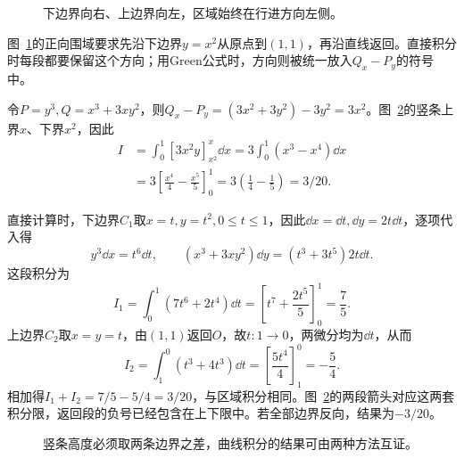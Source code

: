 \begin{figure}[H]\centering
{}
\caption{下边界向右、上边界向左，区域始终在行进方向左侧。}\label{fig:c4-e9-q}
\end{figure}
\begin{solution}
图~\ref{fig:c4-e9-q}的正向围域要求先沿下边界$y=x^2$从原点到$(1,1)$，再沿直线返回。直接积分时每段都要保留这个方向；用Green公式时，方向则被统一放入$Q_x-P_y$的符号中。


令$P=y^3,Q=x^3+3xy^2$，则$Q_x-P_y=(3x^2+3y^2)-3y^2=3x^2$。图~\ref{fig:c4-e9-s}的竖条上界$x$、下界$x^2$，因此
\[\begin{aligned}
I&=\int_0^1[3x^2y]_{x^2}^{x}\dd x
=3\int_0^1(x^3-x^4)\dd x\\
&=3\left[\frac{x^4}{4}-\frac{x^5}{5}\right]_0^1
=3\left(\frac14-\frac15\right)=\boxed{3/20}.
\end{aligned}\]

直接计算时，下边界$C_1$取$x=t,y=t^2,0\le t\le1$，因此$\dd x=\dd t,\dd y=2t\dd t$，逐项代入得
\[y^3\dd x=t^6\dd t,\qquad
(x^3+3xy^2)\dd y=(t^3+3t^5)2t\dd t.\]
这段积分为
\[I_1=\int_0^1(7t^6+2t^4)\dd t
=\left[t^7+\frac{2t^5}{5}\right]_0^1=\frac75.\]
上边界$C_2$取$x=y=t$，由$(1,1)$返回$O$，故$t:1\to0$，两微分均为$\dd t$，从而
\[I_2=\int_1^0(t^3+4t^3)\dd t
=\left[\frac{5t^4}{4}\right]_1^0=-\frac54.\]
相加得$I_1+I_2=7/5-5/4=3/20$，与区域积分相同。图~\ref{fig:c4-e9-s}的两段箭头对应这两套积分限，返回段的负号已经包含在上下限中。若全部边界反向，结果为$-3/20$。

\begin{figure}[H]\centering
{}
\caption{竖条高度必须取两条边界之差，曲线积分的结果可由两种方法互证。}\label{fig:c4-e9-s}
\end{figure}
\end{solution}

